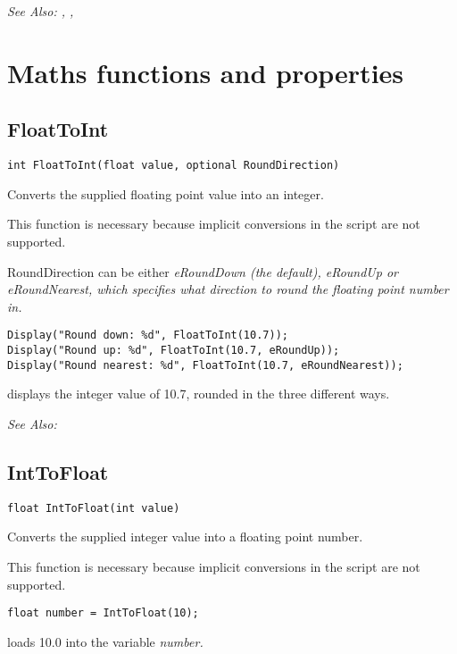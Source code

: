 \it{See Also:} ,
,



\section{Maths functions and properties}%



\subsection{FloatToInt}\label{FloatToInt}%

\begin{verbatim}
int FloatToInt(float value, optional RoundDirection)
\end{verbatim}
Converts the supplied floating point value into an integer.

This function is necessary because implicit conversions in the script are not supported.

RoundDirection can be either \it{eRoundDown} (the default), \it{eRoundUp} or \it{eRoundNearest},
which specifies what direction to round the floating point number in.

\begin{verbatim}
Display("Round down: %d", FloatToInt(10.7));
Display("Round up: %d", FloatToInt(10.7, eRoundUp));
Display("Round nearest: %d", FloatToInt(10.7, eRoundNearest));
\end{verbatim}
displays the integer value of 10.7, rounded in the three different ways.

\it{See Also:} 


\subsection{IntToFloat}\label{IntToFloat}%

\begin{verbatim}
float IntToFloat(int value)
\end{verbatim}
Converts the supplied integer value into a floating point number.

This function is necessary because implicit conversions in the script are not supported.

\begin{verbatim}
float number = IntToFloat(10);
\end{verbatim}
loads 10.0 into the variable \it{number}.

